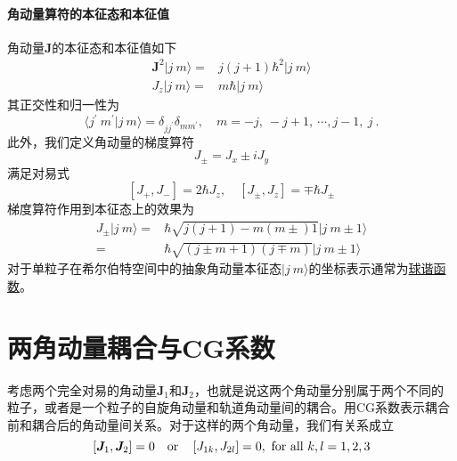 \paragraph*{角动量算符的本征态和本征值} 角动量$\boldsymbol{J}$的本征态和本征值如下
\begin{align}
	\boldsymbol{J}^2 |j\ m\rangle =& j(j+1)\hbar^2 |j\ m\rangle	\\
	J_z |j\ m\rangle =& m\hbar |j\ m\rangle
\end{align}
其正交性和归一性为
\begin{equation}
	\langle j^{\prime}\ m^{\prime} | j\ m\rangle = \delta_{jj^{\prime}}\delta_{mm^{\prime}}, \quad m = -j,\ -j+1, \ \cdots, j-1,\ j \ .
\end{equation}
此外，我们定义角动量的梯度算符
\begin{equation}
	J_{\pm} = J_{x} \pm i J_{y}
\end{equation}
满足对易式
\begin{equation}
	\left[J_{+}, J_{-}\right] = 2\hbar J_z, \quad \left[J_{\pm}, J_{z}\right] = \mp \hbar J_{\pm}
\end{equation}
梯度算符作用到本征态上的效果为
\begin{equation}
	\begin{aligned}
		J_{\pm} |j\ m\rangle =& \hbar \sqrt{j(j+1) - m(m\pm)1} |j\ m\pm 1\rangle	\\
						   =& \hbar \sqrt{(j\pm m +1) (j\mp m)} |j\ m\pm 1\rangle
	\end{aligned}
\end{equation}
对于单粒子在希尔伯特空间中的抽象角动量本征态$|j\ m\rangle$的坐标表示通常为\underline{球谐函数}。

\section{两角动量耦合与CG系数}
考虑两个完全对易的角动量$\boldsymbol{J}_1$和$\boldsymbol{J}_2$，也就是说这两个角动量分别属于两个不同的粒子，或者是一个粒子的自旋角动量和轨道角动量间的耦合。用CG系数表示耦合前和耦合后的角动量间关系。对于这样的两个角动量，我们有关系成立
\begin{equation}
	\left[\bm{J}_1, \bm{J}_2 \right] = 0 \quad
	\text{or}
	\quad
	\left[J_{1k}, J_{2l}\right] = 0,\ \text{for all}\ k, l = 1, 2, 3
\end{equation}

